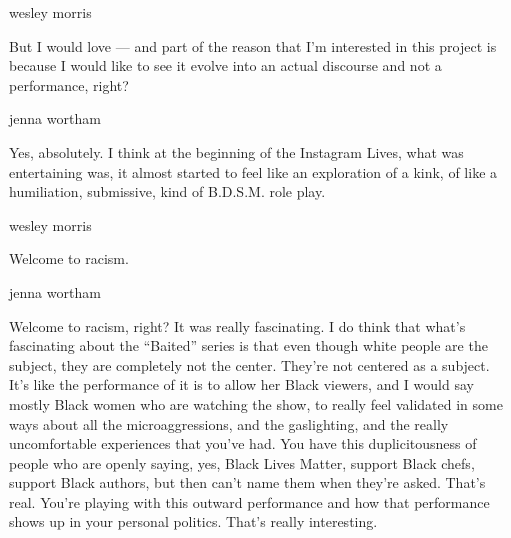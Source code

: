 wesley morris

But I would love --- and part of the reason that I'm interested in this
project is because I would like to see it evolve into an actual
discourse and not a performance, right?

jenna wortham

Yes, absolutely. I think at the beginning of the Instagram Lives, what
was entertaining was, it almost started to feel like an exploration of a
kink, of like a humiliation, submissive, kind of B.D.S.M. role play.

wesley morris

Welcome to racism.

jenna wortham

Welcome to racism, right? It was really fascinating. I do think that
what's fascinating about the ``Baited'' series is that even though white
people are the subject, they are completely not the center. They're not
centered as a subject. It's like the performance of it is to allow her
Black viewers, and I would say mostly Black women who are watching the
show, to really feel validated in some ways about all the
microaggressions, and the gaslighting, and the really uncomfortable
experiences that you've had. You have this duplicitousness of people who
are openly saying, yes, Black Lives Matter, support Black chefs, support
Black authors, but then can't name them when they're asked. That's real.
You're playing with this outward performance and how that performance
shows up in your personal politics. That's really interesting.

